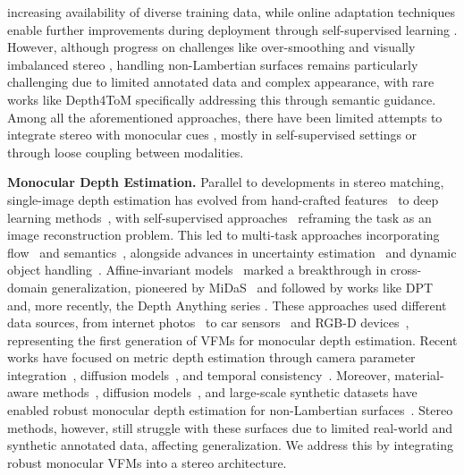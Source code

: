 \documentclass[10pt,twocolumn,letterpaper]{article}
\begin{document}
increasing availability of diverse training data, while online adaptation techniques enable further improvements during deployment through self-supervised learning \cite{tonioni2019real, kim2022pointfix, poggi2021continual, Poggi_2024_CVPR}. However, although progress on challenges like over-smoothing \cite{Tosi2021CVPR_SMD,Xu_CVPR_2024_ADL} and visually imbalanced stereo \cite{liu2020visually,Chen_2022_CVPR,aleotti2021neural,tosi2024neural}, handling non-Lambertian surfaces remains particularly challenging due to limited annotated data and complex appearance, with rare works like Depth4ToM \cite{costanzino2023learning} specifically addressing this through semantic guidance. Among all the aforementioned approaches, there have been limited attempts to integrate stereo with monocular cues \cite{Chen_2021_ICCV, aleotti2020reversing, watson2020learning}, mostly in self-supervised settings or through loose coupling between modalities.

    \textbf{Monocular Depth Estimation.} Parallel to developments in stereo matching, single-image depth estimation has evolved from hand-crafted features~\cite{Saxena2008} to deep learning methods~\cite{chen2016single, eigen2014depth, laina2016deeper, Ramamonjisoa_2020_CVPR, wang2020cliffnet}, with self-supervised approaches~\cite{godard2017unsupervised, zhou2017unsupervised, mahjourian2018unsupervised, godard2019monodepth2, poggi2018learning, watson2019depthhints, zhao2022monovit}  reframing the task as an image reconstruction problem. This led to multi-task approaches incorporating flow~\cite{zou2018df, yin2018geonet, ranjan2019competitive, tosi2020distilled} and semantics~\cite{zama2019geometry, guizilini2020semantically}, alongside advances in uncertainty estimation~\cite{poggi2020uncertainty, hornauer2022gradient} and dynamic object handling~\cite{klingner2020self, sun2023dynamodepth, moon2023ground}.
    Affine-invariant models~\cite{Ranftl2022, Ranftl2021, Yin2020, Eftekhar2021} marked a breakthrough in cross-domain generalization, pioneered by MiDaS~\cite{Ranftl2022} and followed by works like DPT~\cite{Ranftl2021} and, more recently, the Depth Anything series \cite{depth_anything_v1}. These approaches used different data sources, from internet photos~\cite{li2018megadepth,Yin2020,Spencer2023c,Spencer2024} to car sensors~\cite{geiger2012we,menze2015object} and RGB-D devices~\cite{Silberman2012, Cho2021}, representing the first generation of VFMs for monocular depth estimation. Recent works have focused on metric depth estimation through camera parameter integration~\cite{Yin2023, hu2024metric3dv2,Guizilini2023}, diffusion models~\cite{Ji2023, Duan2023, Saxena2023, Saxena2023b, ke2023repurposing, fu2024geowizard}, and temporal consistency~\cite{shao2024learning, hu2024depthcrafter}.
    Moreover, material-aware methods~\cite{costanzino2023learning}, diffusion models~\cite{tosi2024diffusion}, and large-scale synthetic datasets have enabled robust monocular depth estimation for non-Lambertian surfaces~\cite{depth_anything_v2}. Stereo methods, however, still struggle with these surfaces due to limited real-world and synthetic annotated data, affecting generalization. We address this by integrating robust monocular VFMs into a stereo architecture.
\end{document}
